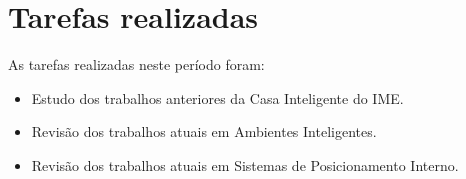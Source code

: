 \section{Tarefas realizadas}\label{tasks}
As tarefas realizadas neste período foram:
\begin{itemize}
    \item Estudo dos trabalhos anteriores da Casa Inteligente do IME.
    \item Revisão dos trabalhos atuais em Ambientes Inteligentes.
    \item Revisão dos trabalhos atuais em Sistemas de Posicionamento Interno.
\end{itemize}